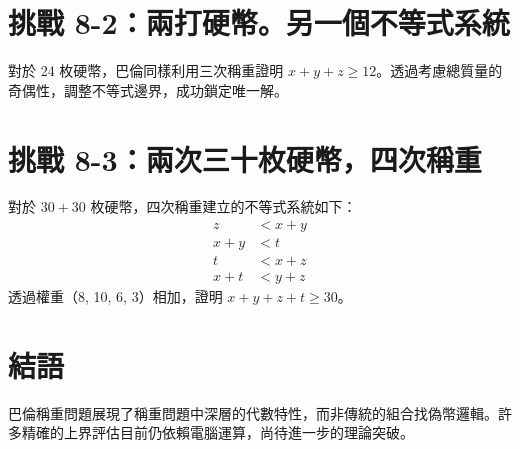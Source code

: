\documentclass[UTF8, a4paper, 12pt]{article}
\begin{document}
\section{挑戰 8-2：兩打硬幣。另一個不等式系統}
對於 24 枚硬幣，巴倫同樣利用三次稱重證明 $x+y+z \ge 12$。透過考慮總質量的奇偶性，調整不等式邊界，成功鎖定唯一解。

\section{挑戰 8-3：兩次三十枚硬幣，四次稱重}
對於 $30+30$ 枚硬幣，四次稱重建立的不等式系統如下：
\begin{align*}
    z &< x + y \\
    x + y &< t \\
    t &< x + z \\
    x + t &< y + z
\end{align*}
透過權重（8, 10, 6, 3）相加，證明 $x+y+z+t \ge 30$。

\section{結語}
巴倫稱重問題展現了稱重問題中深層的代數特性，而非傳統的組合找偽幣邏輯。許多精確的上界評估目前仍依賴電腦運算，尚待進一步的理論突破。
\end{document}
